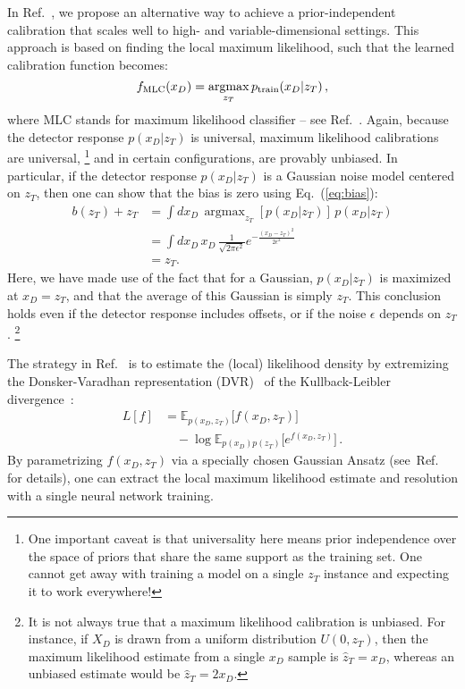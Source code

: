 \documentclass[aps,prd,reprint,preprintnumbers,superscriptaddress,nofootinbib,longbibliography,floatfix]{revtex4-1}
\DeclareMathOperator*{\argmax}{argmax}
\DeclareRobustCommand{\Eq}[1]{Eq.~(\ref{eq:#1})}
\DeclareRobustCommand{\Ref}[1]{Ref.~\cite{#1}}
\begin{document}
In \Ref{frequentstway}, we propose an alternative way to achieve a prior-independent calibration that scales well to high- and variable-dimensional settings.
%
This approach is based on finding the local maximum likelihood, such that the learned calibration function becomes:
%
\begin{equation}
\label{eq:ML_calibration}
f_{\rm MLC}(x_D) = \argmax_{z_T}p_{\text{train}}(x_D|z_T)\,,
\end{equation}
%
where MLC stands for maximum likelihood classifier -- see \Ref{Nachman:2021yvi}.
%
Again, because the detector response $p(x_D|z_T)$ is universal, maximum likelihood calibrations are universal,%
%
\footnote{One important caveat is that universality here means prior independence over the space of priors that share the same support as the training set.  One cannot get away with training a model on a single $z_T$ instance and expecting it to work everywhere!}
%
and in certain configurations, are provably unbiased. In particular, if the detector response $p(x_D|z_T)$ is a Gaussian noise model centered on $z_T$, then one can show that the bias is zero using \Eq{bias}:
%
\begin{align}
    b(z_T)+z_T&=\int dx_D\,\argmax_{z_T}\left[p(x_D|z_T)\right]\,p(x_D|z_T) \\
    &= \int dx_D\,x_D\,\frac{1}{\sqrt{2\pi \epsilon^2}}e^{-\frac{(x_D-z_T)^2}{2\epsilon^2}} \nonumber \\
    &= z_T. \nonumber
\end{align}
%
Here, we have made use of the fact that for a Gaussian, $p(x_D|z_T)$ is maximized at $x_D = z_T$, and that the average of this Gaussian is simply $z_T$. 
%
This conclusion holds even if the detector response includes offsets, or if the noise $\epsilon$ depends on $z_T$.%
%
\footnote{It is not always true that a maximum likelihood calibration is unbiased. For instance, if $X_D$ is drawn from a uniform distribution $U(0, z_T)$, then the maximum likelihood estimate from a single $x_D$ sample is $\hat{z}_T = x_D$, whereas an unbiased estimate would be $\hat{z}_T = 2x_D$.}

The strategy in \Ref{frequentstway} is to estimate the (local) likelihood density by extremizing the Donsker-Varadhan representation (DVR)~\cite{Donsker1975AsymptoticEO, belghazi2018mine} of the Kullback-Leibler divergence~\cite{kullback1951information}:
%
\begin{align}\nonumber
L[f] &= \mathbb{E}_{p(x_D,z_T)}\big[f(x_D,z_T)\big] \\
&\quad -\log \mathbb{E}_{p(x_D)p(z_T)}\big[e^{f(x_D,z_T)}\big]\,. \label{eq:DVR_loss}
\end{align}
%
By parametrizing $f(x_D,z_T)$ via a specially chosen Gaussian Ansatz (see~\Ref{frequentstway} for details), one can extract the local maximum likelihood estimate and resolution with a single neural network training.
\end{document}
